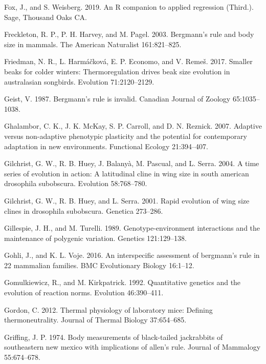 \documentclass[]{article}
\begin{document}
\leavevmode\hypertarget{ref-Fox2019}{}%
Fox, J., and S. Weisberg. 2019. An R companion to applied regression
(Third.). Sage, Thousand Oaks CA.

\leavevmode\hypertarget{ref-Freckleton2003}{}%
Freckleton, R. P., P. H. Harvey, and M. Pagel. 2003. Bergmann's rule and
body size in mammals. The American Naturalist 161:821--825.

\leavevmode\hypertarget{ref-Friedman2017}{}%
Friedman, N. R., L. Harmáčková, E. P. Economo, and V. Remeš. 2017.
Smaller beaks for colder winters: Thermoregulation drives beak size
evolution in australasian songbirds. Evolution 71:2120--2129.

\leavevmode\hypertarget{ref-Geist1987}{}%
Geist, V. 1987. Bergmann's rule is invalid. Canadian Journal of Zoology
65:1035--1038.

\leavevmode\hypertarget{ref-Ghalambor2007}{}%
Ghalambor, C. K., J. K. McKay, S. P. Carroll, and D. N. Reznick. 2007.
Adaptive versus non-adaptive phenotypic plasticity and the potential for
contemporary adaptation in new environments. Functional Ecology
21:394--407.

\leavevmode\hypertarget{ref-Gilchrist2004a}{}%
Gilchrist, G. W., R. B. Huey, J. Balanyà, M. Pascual, and L. Serra.
2004. A time series of evolution in action: A latitudinal cline in wing
size in south american drosophila subobscura. Evolution 58:768--780.

\leavevmode\hypertarget{ref-Gilchrist2001}{}%
Gilchrist, G. W., R. B. Huey, and L. Serra. 2001. Rapid evolution of
wing size clines in drosophila subobscura. Genetica 273--286.

\leavevmode\hypertarget{ref-Gillespie1989}{}%
Gillespie, J. H., and M. Turelli. 1989. Genotype-environment
interactions and the maintenance of polygenic variation. Genetics
121:129--138.

\leavevmode\hypertarget{ref-Gohli2016}{}%
Gohli, J., and K. L. Voje. 2016. An interspecific assessment of
bergmann's rule in 22 mammalian families. BMC Evolutionary Biology
16:1--12.

\leavevmode\hypertarget{ref-Gomulkiewicz1992}{}%
Gomulkiewicz, R., and M. Kirkpatrick. 1992. Quantitative genetics and
the evolution of reaction norms. Evolution 46:390--411.

\leavevmode\hypertarget{ref-Gordon2012}{}%
Gordon, C. 2012. Thermal physiology of laboratory mice: Defining
thermoneutrality. Journal of Thermal Biology 37:654--685.

\leavevmode\hypertarget{ref-Griffing1974}{}%
Griffing, J. P. 1974. Body measurements of black-tailed jackrabbits of
southeastern new mexico with implications of allen's rule. Journal of
Mammalogy 55:674--678.
\end{document}

